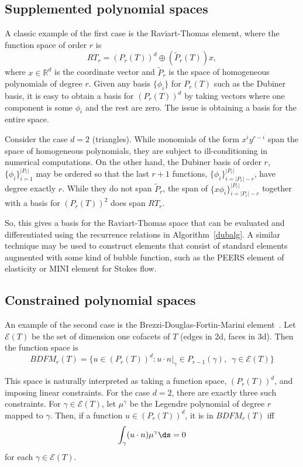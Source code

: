 \subsection{Supplemented polynomial spaces}

A classic example of the first case is the Raviart-Thomas element,
where the function space of order \(r \) is
\[
RT_r = \left( P_r(T) \right)^d \oplus \left( \tilde{P}_r(T) \right) x,
\]
where \( x \in \mathbb{R}^d \) is the coordinate vector and \( \tilde{P}_r
\) is the space of homogeneous polynomials of degree \( r \).  Given any
basis \( \{ \phi_i \} \) for \( P_r(T) \) such as the Dubiner basis, it
is easy to obtain a basis for \( (P_r(T))^d \) by taking vectors where
one component is some \( \phi_i \) and the rest are zero.  The issue is
obtaining a basis for the entire space.

Consider the case \( d = 2 \) (triangles).  While monomials of the form
\( x^i y^{r-i} \) span the space of homogeneous polynomials, they are
subject to ill-conditioning in numerical computations.  On the other
hand, the Dubiner basis of order \( r \), \( \{ \phi_i \}_{i=1}^{|P_r|}
\) may be ordered so that the last \( r + 1 \) functions, \( \{ \phi_i
\}_{i=|P_r|-r}^{|P_r|} \), have degree exactly \( r \).  While they do not
span \( \tilde{P}_r \), the span of \( \{ x \phi_i \}_{i=|P_r|-r}^{|P_r|}
\) together with a basis for \( (P_r(T))^2 \) does span \( RT_r \).

So, this gives a basis for the Raviart-Thomas space that can be
evaluated and differentiated using the recurrence relations in
Algorithm~\ref{dubalg}.  A similar technique may be used to construct
elements that consist of standard elements augmented with some kind of
bubble function, such as the PEERS element of elasticity or MINI element
for Stokes flow.


\subsection{Constrained polynomial spaces}

An example of the second case is the Brezzi-Douglas-Fortin-Marini
element~\citep{BrezziFortin1991}.  Let \( \mathcal{E}(T) \) be the set of dimension
one cofacets of \( T \) (edges in 2d, faces in 3d).  Then the function
space is
\[
BDFM_r(T) = \{ u \in (P_r(T))^d : u\cdot n|_{\gamma} \in
P_{r-1}(\gamma), \, \, \, \gamma \in \mathcal{E}(T) \}
\]

This space is naturally interpreted as taking a function space, \(
(P_r(T))^d \), and imposing linear constraints.  For the case \( d =
2 \), there are exactly three such constraints.  For \( \gamma \in
\mathcal{E}(T) \), let \( \mu^\gamma \) be the Legendre polynomial of
degree \( r \) mapped to \( \gamma \).  Then, if a function \( u \in
(P_r(T))^d \), it is in \( BDFM_r(T) \) iff
\[
\int_{\gamma} ( u \cdot n ) \mu^\gamma \ds = 0
\]
for each \( \gamma \in \mathcal{E}(T) \).

